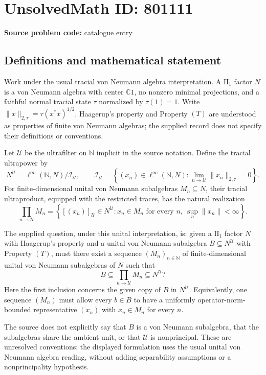 \documentclass[11pt]{article}
\newcommand{\N}{\mathbb{N}}
\newcommand{\C}{\mathbb{C}}
\begin{document}
\section*{UnsolvedMath ID: 801111}
\textbf{Source problem code:} catalogue entry
\subsection{Definitions and mathematical statement}
Work under the usual tracial von Neumann algebra interpretation. A \(\mathrm{II}_1\) factor \(N\) is a von Neumann algebra with center \(\C 1\), no nonzero minimal projections, and a faithful normal tracial state \(\tau\) normalized by \(\tau(1)=1\). Write \(\|x\|_{2,\tau}=\tau(x^*x)^{1/2}\). Haagerup's property and Property \((T)\) are understood as properties of finite von Neumann algebras; the supplied record does not specify their definitions or conventions.

Let \(\mathcal U\) be the ultrafilter on \(\N\) implicit in the source notation. Define the tracial ultrapower by
\[
N^{\mathcal U}=\ell^\infty(\N,N)/\mathcal I_{\mathcal U},\qquad
\mathcal I_{\mathcal U}=\left\{(x_n)\in\ell^\infty(\N,N):\lim_{n\to\mathcal U}\|x_n\|_{2,\tau}=0\right\}.
\]
For finite-dimensional unital von Neumann subalgebras \(M_n\subseteq N\), their tracial ultraproduct, equipped with the restricted traces, has the natural realization
\[
\prod_{n\to\mathcal U}M_n
=\left\{[(x_n)]_{\mathcal U}\in N^{\mathcal U}:x_n\in M_n\text{ for every }n,\ \sup_n\|x_n\|<\infty\right\}.
\]

The supplied question, under this unital interpretation, is: given a \(\mathrm{II}_1\) factor \(N\) with Haagerup's property and a unital von Neumann subalgebra \(B\subseteq N^{\mathcal U}\) with Property \((T)\), must there exist a sequence \((M_n)_{n\in\N}\) of finite-dimensional unital von Neumann subalgebras of \(N\) such that
\[
B\subseteq\prod_{n\to\mathcal U}M_n\subseteq N^{\mathcal U}?
\]
Here the first inclusion concerns the given copy of \(B\) in \(N^{\mathcal U}\). Equivalently, one sequence \((M_n)\) must allow every \(b\in B\) to have a uniformly operator-norm-bounded representative \((x_n)\) with \(x_n\in M_n\) for every \(n\).

The source does not explicitly say that \(B\) is a von Neumann subalgebra, that the subalgebras share the ambient unit, or that \(\mathcal U\) is nonprincipal. These are unresolved conventions: the displayed formulation uses the usual unital von Neumann algebra reading, without adding separability assumptions or a nonprincipality hypothesis.
\end{document}
